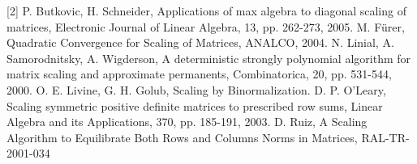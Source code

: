 \documentclass{report}
\begin{document}
[2] P. Butkovic, H. Schneider, Applications of max algebra to diagonal
scaling of matrices, Electronic Journal of Linear Algebra, 13, pp.
262-273, 2005.
\newline
[3] M. F\"{u}rer, Quadratic Convergence for Scaling of Matrices, ANALCO, 2004.
\newline
[4] N. Linial, A. Samorodnitsky, A. Wigderson, A deterministic strongly
polynomial algorithm for matrix scaling and approximate permanents,
Combinatorica, 20, pp. 531-544, 2000.
\newline
[5] O. E. Livine, G. H. Golub, Scaling by Binormalization.
\newline
[6] D. P. O'Leary, Scaling symmetric positive definite matrices to
prescribed row sums, Linear Algebra and its Applications, 370, pp.
185-191, 2003.
\newline
[7] D. Ruiz, A Scaling Algorithm to Equilibrate Both Rows and Columns
Norms in Matrices, RAL-TR-2001-034
\end{document}
